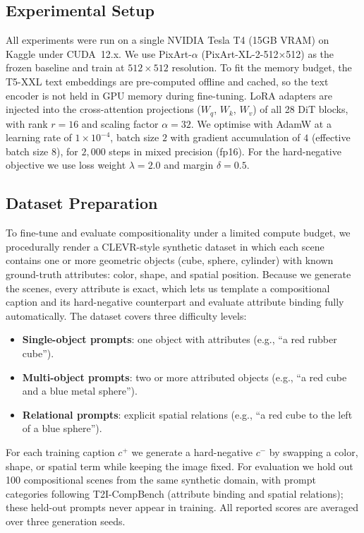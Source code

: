 \documentclass[12pt,onecolumn]{IEEEtran}
\begin{document}
\subsection{Experimental Setup}\label{subsec:setup}
All experiments were run on a single NVIDIA Tesla T4 (15GB VRAM) on Kaggle under CUDA~12.x. We use PixArt-$\alpha$ (PixArt-XL-2-512$\times$512) as the frozen baseline and train at $512\times512$ resolution. To fit the memory budget, the T5-XXL text embeddings are pre-computed offline and cached, so the text encoder is not held in GPU memory during fine-tuning. LoRA adapters are injected into the cross-attention projections ($W_q$, $W_k$, $W_v$) of all 28 DiT blocks, with rank $r=16$ and scaling factor $\alpha=32$. We optimise with AdamW at a learning rate of $1\times10^{-4}$, batch size $2$ with gradient accumulation of $4$ (effective batch size $8$), for $2{,}000$ steps in mixed precision (fp16). For the hard-negative objective we use loss weight $\lambda=2.0$ and margin $\delta=0.5$.

\subsection{Dataset Preparation}
To fine-tune and evaluate compositionality under a limited compute budget, we procedurally render a CLEVR-style synthetic dataset in which each scene contains one or more geometric objects (cube, sphere, cylinder) with known ground-truth attributes: color, shape, and spatial position. Because we generate the scenes, every attribute is exact, which lets us template a compositional caption and its hard-negative counterpart and evaluate attribute binding fully automatically. The dataset covers three difficulty levels:
\begin{itemize}
    \item \textbf{Single-object prompts}: one object with attributes (e.g., ``a red rubber cube'').
    \item \textbf{Multi-object prompts}: two or more attributed objects (e.g., ``a red cube and a blue metal sphere'').
    \item \textbf{Relational prompts}: explicit spatial relations (e.g., ``a red cube to the left of a blue sphere'').
\end{itemize}
For each training caption $c^+$ we generate a hard-negative $c^-$ by swapping a color, shape, or spatial term while keeping the image fixed. For evaluation we hold out 100 compositional scenes from the same synthetic domain, with prompt categories following T2I-CompBench \cite{huang2023t2i} (attribute binding and spatial relations); these held-out prompts never appear in training. All reported scores are averaged over three generation seeds.
\end{document}
